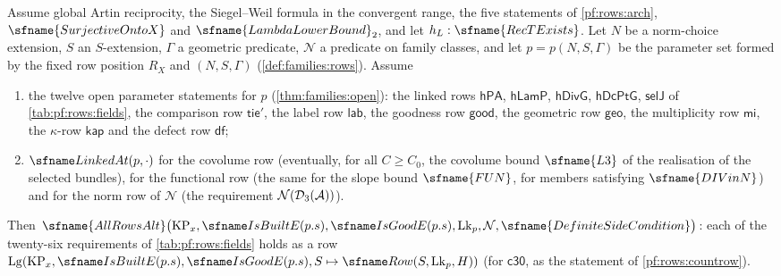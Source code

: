 \begin{theorem}\label{pf:rows:main}
Assume global Artin reciprocity, the Siegel--Weil formula in the convergent range, the five statements of
\cref{pf:rows:arch}, $\sfname{SurjectiveOntoX}$ and $\sfname{LambdaLowerBound}_2$, and let
$h_L:\sfname{RecTExists}$. Let $N$ be a norm-choice extension, $S$ an $S$-extension, $\Gamma$ a geometric predicate,
$\mathcal N$ a predicate on family classes, and let $p=p(N,S,\Gamma)$ be the parameter set formed by the fixed row
position $R_X$ and $(N,S,\Gamma)$ (\cref{def:families:rows}). Assume
\begin{enumerate}[label=(\roman*)]
\item the twelve open parameter statements for $p$ (\cref{thm:families:open}): the linked
rows $\mathsf{hPA}$, $\mathsf{hLamP}$, $\mathsf{hDivG}$, $\mathsf{hDcPtG}$, $\mathsf{selJ}$ of \cref{tab:pf:rows:fields},
the comparison row $\mathsf{tie}'$, the label row $\mathsf{lab}$, the goodness row $\mathsf{good}$, the geometric row
$\mathsf{geo}$, the multiplicity row $\mathsf{mi}$, the $\kappa$-row $\mathsf{kap}$ and the defect row $\mathsf{df}$;
\item $\rowsLinked(p,\cdot)$ for the covolume row (eventually, for all $C\ge C_0$, the covolume bound $\sfname{L3}$ of the
realisation of the selected bundles), for the functional row (the same for the slope bound $\sfname{FUN}$, for members
satisfying $\sfname{DIVinN}$) and for the norm row of $\mathcal N$ (the requirement $\mathcal N(\mathcal{D}_3(\mathcal A))$).
\end{enumerate}
Then $\sfname{AllRowsAlt}\bigl(\rowsKPx,\rowsBuilt(p.s),\rowsGood(p.s),\rowsLk_p,\mathcal N,\sfname{DefiniteSideCondition}\bigr)$:
each of the twenty-six requirements of \cref{tab:pf:rows:fields} holds as a row $\rowsLg(\rowsKPx,\rowsBuilt(p.s),
\rowsGood(p.s),S\mapsto\rowsRow(S,\rowsLk_p,H))$ (for $\mathsf{c30}$, as the statement of \cref{pf:rows:countrow}).
\end{theorem}

